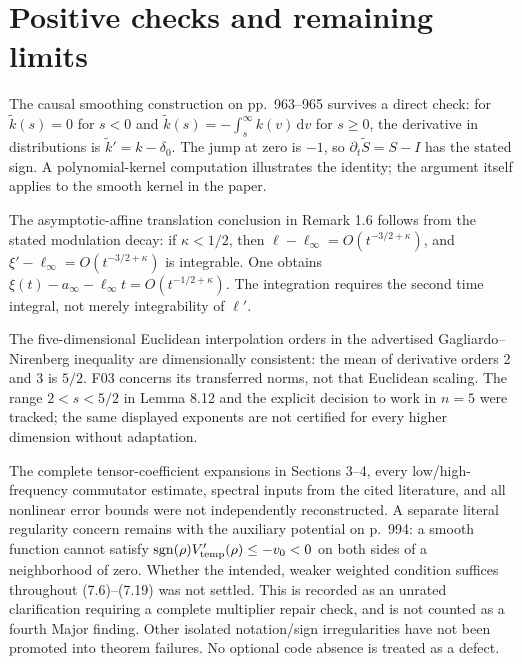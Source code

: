 \documentclass[10pt]{article}
\begin{document}
\section*{Positive checks and remaining limits}
The causal smoothing construction on pp. 963–965 survives a direct check: for \(\widetilde k(s)=0\) for \(s<0\) and \(\widetilde k(s)=-\int_s^\infty k(v)\,\mathrm dv\) for \(s\geq0\), the derivative in distributions is \(\widetilde k'=k-\delta_0\). The jump at zero is \(-1\), so \(\partial_t\widetilde S=S-I\) has the stated sign. A polynomial-kernel computation illustrates the identity; the argument itself applies to the smooth kernel in the paper.\par
The asymptotic-affine translation conclusion in Remark 1.6 follows from the stated modulation decay: if \(\kappa<1/2\), then \(\ell-\ell_\infty=O(t^{-3/2+\kappa})\), and \(\xi'-\ell_\infty=O(t^{-3/2+\kappa})\) is integrable. One obtains \(\xi(t)-a_\infty-\ell_\infty t=O(t^{-1/2+\kappa})\). The integration requires the second time integral, not merely integrability of \(\ell'\).\par
The five-dimensional Euclidean interpolation orders in the advertised Gagliardo–Nirenberg inequality are dimensionally consistent: the mean of derivative orders 2 and 3 is \(5/2\). F03 concerns its transferred norms, not that Euclidean scaling. The range \(2<s<5/2\) in Lemma 8.12 and the explicit decision to work in \(n=5\) were tracked; the same displayed exponents are not certified for every higher dimension without adaptation.\par
The complete tensor-coefficient expansions in Sections 3–4, every low/high-frequency commutator estimate, spectral inputs from the cited literature, and all nonlinear error bounds were not independently reconstructed. A separate literal regularity concern remains with the auxiliary potential on p. 994: a smooth function cannot satisfy \(\operatorname{sgn}(\rho)V_{\rm temp}'(\rho)\leq-v_0<0\) on both sides of a neighborhood of zero. Whether the intended, weaker weighted condition suffices throughout (7.6)–(7.19) was not settled. This is recorded as an unrated clarification requiring a complete multiplier repair check, and is not counted as a fourth Major finding. Other isolated notation/sign irregularities have not been promoted into theorem failures. No optional code absence is treated as a defect.\par
\end{document}
